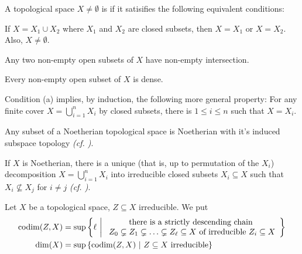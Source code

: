 \documentclass[a4paper,parskip=full,numbers=enddot]{scrreprt}
\begin{document}
\begin{defi}
 A topological space $X\not=\emptyset$ is  if it satisifies the following equivalent conditions:
 \begin{alphanumerate}
    \item If $X = X_1\cup X_2$ where $X_1$ and $X_2$ are closed subsets, then $X=X_1$ or $X=X_2$. Also, $X\neq\emptyset$.
    \item Any two non-empty open subsets of $X$ have non-empty intersection.
    \item Every non-empty open subset of $X$ is dense.
 \end{alphanumerate}
\end{defi}
Condition (a) implies, by induction, the following more general property: 
For any finite cover $X= \bigcup_{i=1}^n X_i$ by closed subsets, there is $1\leq i\leq n$ such that $X=X_i$.
\begin{prop}
 \begin{alphanumerate}
    \item {}
        Any subset of a Noetherian topological space is Noetherian with it's induced subspace topology \emph{(cf. \cite[Remark~2.2.1]{alg1})}.
    \item 
        If $X$ is Noetherian, there is a unique (that is, up to permutation of the $X_i$) decomposition $X = \bigcup_{i=1}^n X_i$ into irreducible closed subsets $X_i\subseteq X$ such that $X_i\not\subseteq X_j$ for $i\neq j$ \emph{(cf. \cite[Proposition~2.1.1]{alg1})}.
 \end{alphanumerate}

\end{prop}
\begin{defi}
 Let $X$ be a topological space, $Z\subseteq X$ irreducible. We put 
 \begin{align*}
    \operatorname{codim}(Z,X) &= \sup\left\{\ell\ \middle|\  
    \begin{array}{c}
	    \text{there is a strictly descending chain }\\
	    Z_0 \subsetneq Z_1\subsetneq \ldots \subsetneq Z_\ell\subseteq X\text{ of irreducible }Z_i\subseteq X
    \end{array}\right\}\\
    \dim(X) &= \sup\left\{\operatorname{codim}(Z,X)\ \middle|\  Z\subseteq X \text{ irreducible}\right\}
 \end{align*}
\end{defi}
\end{document}
